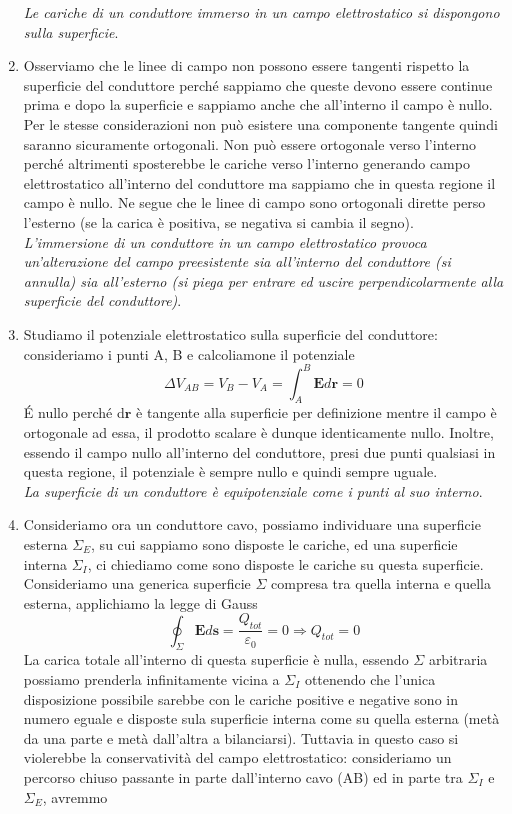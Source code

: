 \documentclass[10pt,a4paper]{article}
\begin{document}
\begin{enumerate}
\textit{Le cariche di un conduttore immerso in un campo elettrostatico si dispongono sulla superficie}.
\item Osserviamo che le linee di campo non possono essere tangenti rispetto la superficie del conduttore perché sappiamo che queste devono essere continue prima e dopo la superficie e sappiamo anche che all'interno il campo è nullo. Per le stesse considerazioni non può esistere una componente tangente quindi saranno sicuramente ortogonali. Non può essere ortogonale verso l'interno perché altrimenti sposterebbe le cariche verso l'interno generando campo elettrostatico all'interno del conduttore ma sappiamo che in questa regione il campo è nullo. Ne segue che le linee di campo sono ortogonali dirette perso l'esterno (se la carica è positiva, se negativa si cambia il segno).\\
\textit{L'immersione di un conduttore in un campo elettrostatico provoca un'alterazione del campo preesistente sia all'interno del conduttore (si annulla) sia all'esterno (si piega per entrare ed uscire perpendicolarmente alla superficie del conduttore)}.
\item Studiamo il potenziale elettrostatico sulla superficie del conduttore: consideriamo i punti A, B e calcoliamone il potenziale
\[\Delta V_{AB} = V_B - V_A = \int_A^B \mathbf{E}d\mathbf{r} = 0\]
\'E nullo perché d$\mathbf{r}$ è tangente alla superficie per definizione mentre il campo è ortogonale ad essa, il prodotto scalare è dunque identicamente nullo. Inoltre, essendo il campo nullo all'interno del conduttore, presi due punti qualsiasi in questa regione, il potenziale è sempre nullo e quindi sempre uguale.\\
\textit{La superficie di un conduttore è equipotenziale come i punti al suo interno}.
\item Consideriamo ora un conduttore cavo, possiamo individuare una superficie esterna $\Sigma_E$, su cui sappiamo sono disposte le cariche, ed una superficie interna $\Sigma_I$, ci chiediamo come sono disposte le cariche su questa superficie. Consideriamo una generica superficie $\Sigma$ compresa tra quella interna e quella esterna, applichiamo la legge di Gauss
\[\oint_\Sigma \mathbf{E}d\mathbf{s} = \frac{Q_{tot}}{\varepsilon_0} = 0 \Rightarrow Q_{tot} = 0\]
La carica totale all'interno di questa superficie è nulla, essendo $\Sigma$ arbitraria possiamo prenderla infinitamente vicina a $\Sigma_I$ ottenendo che l'unica disposizione possibile sarebbe con le cariche positive e negative sono in numero eguale e disposte sula superficie interna come su quella esterna (metà da una parte e metà dall'altra a bilanciarsi). Tuttavia in questo caso si violerebbe la conservatività del campo elettrostatico: consideriamo un percorso chiuso passante in parte dall'interno cavo (AB) ed in parte tra $\Sigma_I$ e $\Sigma_E$, avremmo

\end{enumerate}
\end{document}
